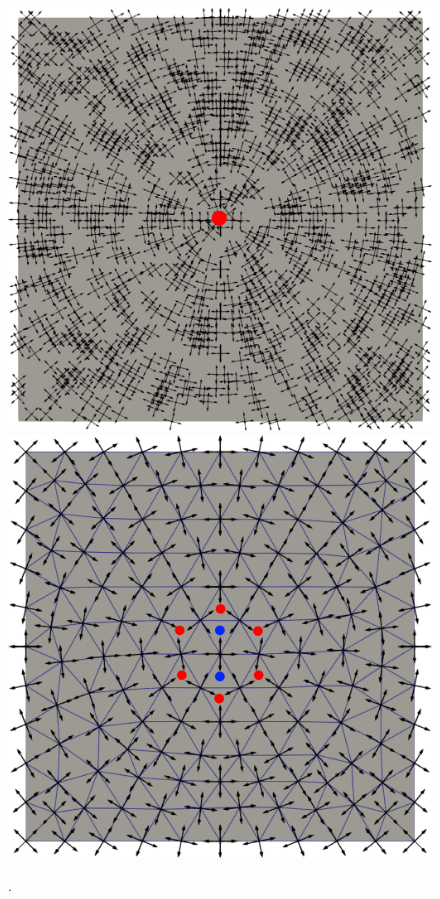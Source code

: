 \begin{figure}[!h]
  \centering
  \includegraphics[scale=0.27]{images/u_sing.pdf}\hspace{0.2cm}
  \includegraphics[scale=0.26]{images/u_h_sing.pdf}
  \caption{.}
  \label{fig:eclatement_point_sing}
\end{figure}


